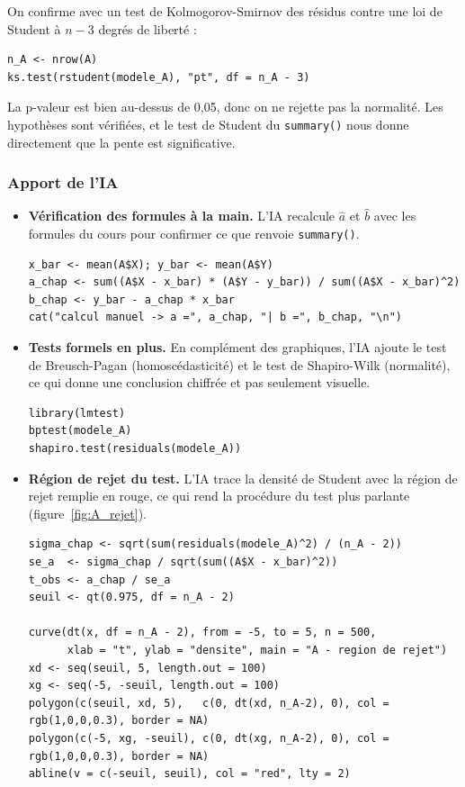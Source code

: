 \documentclass[11pt,a4paper]{article}
\begin{document}
On confirme avec un test de Kolmogorov-Smirnov des résidus contre une loi de Student à $n-3$ degrés de liberté :

\begin{lstlisting}
n_A <- nrow(A)
ks.test(rstudent(modele_A), "pt", df = n_A - 3)
\end{lstlisting}

La p-valeur est bien au-dessus de 0,05, donc on ne rejette pas la normalité. Les hypothèses sont vérifiées, et le test de Student du \texttt{summary()} nous donne directement que la pente est significative.

\subsubsection{Apport de l'IA}

\begin{itemize}
    \item \textbf{Vérification des formules à la main.} L'IA recalcule $\hat{a}$ et $\hat{b}$ avec les formules du cours pour confirmer ce que renvoie \texttt{summary()}.

\begin{lstlisting}
x_bar <- mean(A$X); y_bar <- mean(A$Y)
a_chap <- sum((A$X - x_bar) * (A$Y - y_bar)) / sum((A$X - x_bar)^2)
b_chap <- y_bar - a_chap * x_bar
cat("calcul manuel -> a =", a_chap, "| b =", b_chap, "\n")
\end{lstlisting}

    \item \textbf{Tests formels en plus.} En complément des graphiques, l'IA ajoute le test de Breusch-Pagan (homoscédasticité) et le test de Shapiro-Wilk (normalité), ce qui donne une conclusion chiffrée et pas seulement visuelle.

\begin{lstlisting}
library(lmtest)
bptest(modele_A)
shapiro.test(residuals(modele_A))
\end{lstlisting}

    \item \textbf{Région de rejet du test.} L'IA trace la densité de Student avec la région de rejet remplie en rouge, ce qui rend la procédure du test plus parlante (figure~\ref{fig:A_rejet}).

\begin{lstlisting}
sigma_chap <- sqrt(sum(residuals(modele_A)^2) / (n_A - 2))
se_a  <- sigma_chap / sqrt(sum((A$X - x_bar)^2))
t_obs <- a_chap / se_a
seuil <- qt(0.975, df = n_A - 2)

curve(dt(x, df = n_A - 2), from = -5, to = 5, n = 500,
      xlab = "t", ylab = "densite", main = "A - region de rejet")
xd <- seq(seuil, 5, length.out = 100)
xg <- seq(-5, -seuil, length.out = 100)
polygon(c(seuil, xd, 5),   c(0, dt(xd, n_A-2), 0), col = rgb(1,0,0,0.3), border = NA)
polygon(c(-5, xg, -seuil), c(0, dt(xg, n_A-2), 0), col = rgb(1,0,0,0.3), border = NA)
abline(v = c(-seuil, seuil), col = "red", lty = 2)
\end{lstlisting}


\end{itemize}
\end{document}
